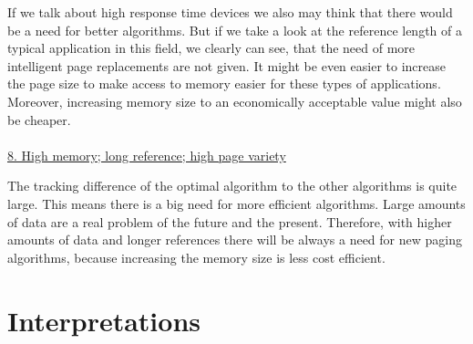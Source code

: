 \documentclass[12pt, reqno]{amsart}
\numberwithin{equation}{section}
\begin{document}
If we talk about high response time devices we also may think that there would be a need for better algorithms. But if we take a look at the reference
length of a typical application in this field, we clearly can see, that the need of more intelligent page replacements are not given. It might be even easier to increase
the page size to make access to memory easier for these types of applications. Moreover, increasing memory size to an economically acceptable value 
might also be cheaper. \\ \\

\underline{8. High memory; long reference; high page variety} \\
\begin{center}
\end{center}

The tracking difference of the optimal algorithm to the other algorithms is quite large. This means there is a big need for more efficient algorithms. 
Large amounts of data are a real problem of the future and the present. Therefore, with higher amounts of data and longer references there will be always a need
for new paging algorithms, because increasing the memory size is less cost efficient.

\section{Interpretations}
\end{document}
